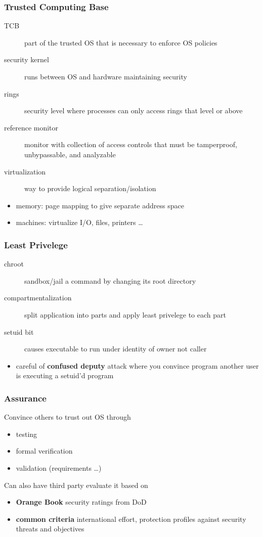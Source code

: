 \documentclass[]{article}
\theoremstyle{definition}
\begin{document}
	\subsubsection{Trusted Computing Base}
	\begin{description}
		\item[TCB] part of the trusted OS that is necessary to enforce OS policies
		\item[security kernel] runs between OS and hardware maintaining security
		\item[rings] security level where processes can only access rings that level or above
		\item[reference monitor] monitor with collection of access controls that must be tamperproof, unbypassable, and analyzable
		\item[virtualization] way to provide logical separation/isolation
	\end{description}
	\begin{itemize}
		\item memory: page mapping to give separate address space
		\item machines: virtualize I/O, files, printers \dots
	\end{itemize}

	\subsubsection{Least Privelege}
	\begin{description}
		\item[chroot] sandbox/jail a command by changing its root directory
		\item[compartmentalization] split application into parts and apply least privelege to each part
		\item[setuid bit] causes executable to run under identity of owner not caller
	\end{description}
	\begin{itemize}
		\item careful of \textbf{confused deputy} attack where you convince program another user is executing a setuid'd program
	\end{itemize}

	\subsubsection{Assurance}
	Convince others to trust out OS through
	\begin{itemize}
		\item testing
		\item formal verification
		\item validation (requirements \dots)
	\end{itemize}

	Can also have third party evaluate it based on
	\begin{itemize}
		\item \textbf{Orange Book} security ratings from DoD
		\item \textbf{common criteria} international effort, protection profiles against security threats and objectives
	\end{itemize}
\end{document}
